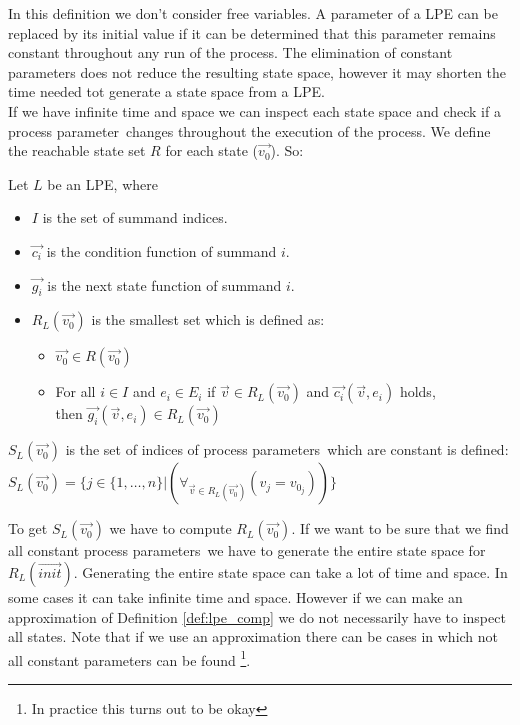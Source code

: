 \documentclass[a4paper,10pt]{article}
\newcommand{\ovr}{\overrightarrow}
\newcommand{\pp}{process parameter}
\newcommand{\pps}{process parameters}
\begin{document}
In this definition we don't consider free variables.
A parameter of a LPE can be replaced by its initial value if it can be determined that this parameter remains constant throughout any run of the process. The elimination of constant parameters does not reduce the resulting state space, however it may shorten the time needed tot generate a state space from a LPE. \\
If we have infinite time and space we can inspect each state space and check if a \pp\ changes throughout the execution of the process. We define the reachable state set $R$ for each state ($\ovr{v_0}$). So:
\begin{defn}\label{def:lpe} Let $L$ be an LPE, where\begin{itemize}
\item $I$ is the set of summand indices.
\item $\ovr{c_i}$ is the condition function of summand $i$.
\item $\ovr{g_i}$ is the next state function of summand $i$.
\item
$R_L(\ovr{v_0})$ is the smallest set which is defined as:
  \begin{itemize}
    \item $\ovr{v_0} \in R(\ovr{v_0})$
    \item For all $i \in I$ and $e_i \in E_i$ if $\ovr{v} \in R_L(\ovr{v_0})$ and $\ovr{c_i}(\ovr{v}, e_i)$ holds, \\ then $\ovr{g_i}(\ovr{v}, e_i) \in R_L(\ovr{v_0})$ \\
   \end{itemize}
\end{itemize}

\end{defn}


\begin{defn}\label{def:lpe_comp}
$S_L(\ovr{v_0})$ is the set of indices of \pps\ which are constant is defined:\\

$S_L(\ovr{v_0}) = \lbrace j \in  \lbrace 1, \ldots, n \rbrace \vert (\forall_{\ovr{v} \in R_L(\ovr{v_0})}( v_j = v_{0_j})) \rbrace $
\end{defn}

To get $S_L(\ovr{v_0})$ we have to compute $R_L(\ovr{v_0})$. If we want to be sure that we find all constant \pps\ we have to generate the entire state space for $R_L(\ovr{init})$. Generating the entire state space can take a lot of time and space. In some cases it can take infinite time and space. However if we can make an approximation of Definition \ref{def:lpe_comp} we do not necessarily have to inspect all states. Note that if we use an approximation there can be cases in which not all constant parameters can be found \footnote{In practice this turns out to be okay}.  
\end{document}
